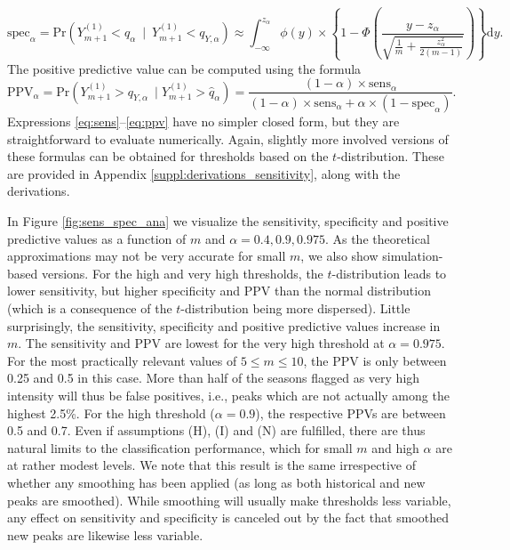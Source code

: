 \documentclass[12pt]{article}
\begin{document}
\begin{equation}
\text{spec}_\alpha = \text{Pr}\left(Y_{m + 1}^{(1)} < \hat{q}_\alpha \ \mid \ Y_{m + 1}^{(1)} < q_{Y, \alpha}\right) \approx \int_{-\infty}^{z_\alpha}\phi(y) \times \left\{1 - \Phi\left(\frac{y - z_\alpha}{\sqrt{\frac{1}{m} + \frac{z_\alpha^2}{2(m - 1)}}}\right)\right\} \text{d}y.
\label{eq:spec}
\end{equation}
The positive predictive value can be computed using the formula \citep{Altman1994}
\begin{equation}
\text{PPV}_\alpha = \text{Pr}(Y_{m + 1}^{(1)} > q_{Y, \alpha} \ \mid Y_{m + 1}^{(1)} > \hat{q}_\alpha) = \frac{(1 - \alpha) \times \text{sens}_\alpha}{(1 - \alpha) \times \text{sens}_\alpha + \alpha \times (1 - \text{spec}_\alpha)}.
\label{eq:ppv}
\end{equation}
Expressions \eqref{eq:sens}--\eqref{eq:ppv} have no simpler closed form, but they are straightforward to evaluate numerically. Again, slightly more involved versions of these formulas can be obtained for thresholds based on the $t$-distribution. These are provided in Appendix \ref{suppl:derivations_sensitivity}, along with the derivations.

In Figure \ref{fig:sens_spec_ana} we visualize the sensitivity, specificity and positive predictive values as a function of $m$ and $\alpha = 0.4, 0.9, 0.975 $. As the theoretical approximations may not be very accurate for small $m$, we also show simulation-based versions. For the high and very high thresholds, the $t$-distribution leads to lower sensitivity, but higher specificity and PPV than the normal distribution (which is a consequence of the $t$-distribution being more dispersed). Little surprisingly, the sensitivity, specificity and positive predictive values increase in $m$. The sensitivity and PPV are lowest for the very high threshold at $\alpha = 0.975$. For the most practically relevant values of $5 \leq m \leq 10$, the PPV is only between 0.25 and 0.5 in this case. More than half of the seasons flagged as very high intensity will thus be false positives, i.e., peaks which are not actually among the highest 2.5\%. For the high threshold ($\alpha = 0.9$), the respective PPVs are between 0.5 and 0.7. Even if assumptions (H), (I) and (N) are fulfilled, there are thus natural limits to the classification performance, which for small $m$ and high $\alpha$ are at rather modest levels. We note that this result is the same irrespective of whether any smoothing has been applied (as long as both historical and new peaks are smoothed). While smoothing will usually make thresholds less variable, any effect on sensitivity and specificity is canceled out by the fact that smoothed new peaks are likewise less variable.
\end{document}
